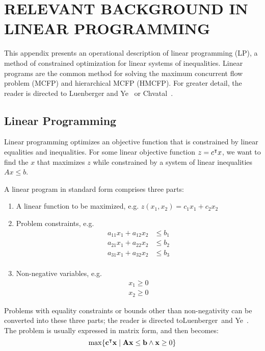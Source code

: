 \chapter{RELEVANT BACKGROUND IN LINEAR PROGRAMMING} \label{app:LP}%

This appendix presents an operational description of linear programming (LP), a method of constrained optimization for linear systems of inequalities. Linear programs are the common method for solving the maximum concurrent flow problem (MCFP) and hierarchical MCFP (HMCFP). For greater detail, the reader is directed to Luenberger and Ye~\cite{luenberger2008linear} or Chvatal~\cite{chvatal1983linear}.

\section{Linear Programming}

Linear programming optimizes an objective function that is constrained by linear equalities and inequalities. For some linear objective function $z = c ^\intercal x$, we want to find the $x$ that maximizes $z$ while constrained by a system of linear inequalities $Ax \leq b$. 

A linear program in standard form comprises three parts:
\begin{enumerate}
\item A linear  function to be maximized, e.g. $ z(x_{1},x_{2}) = c_1 x_1 + c_2 x_2$
\item Problem constraints, e.g.
\begin{equation}
\begin{matrix}
  a_{11} x_1 + a_{12} x_2 &\leq b_1 \\
  a_{21} x_1 + a_{22} x_2 &\leq b_2 \\
  a_{31} x_1 + a_{32} x_2 &\leq b_3 \\
\end{matrix}\end{equation}
\item Non-negative variables, e.g.
\begin{equation}\begin{matrix}
 x_1 \geq 0 \\
 x_2 \geq 0
\end{matrix}\end{equation}
\end{enumerate}
Problems with equality constraints or bounds other than non-negativity can be converted into these three parts; the reader is directed toLuenberger~and Ye~\cite{luenberger2008linear}. The problem is usually expressed in matrix form, and then becomes:
\begin{equation}
\max \{ %
\mathbf{c} \transpose
\mathbf{x} \;|\;
 \mathbf{A} \mathbf{x} \leq \mathbf{b} \land \mathbf{x} \geq 0 \}
\end{equation}

